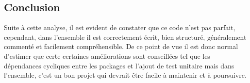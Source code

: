 \documentclass[12pt,a4paper,final]{article}
\begin{document}
\subsection{Conclusion}
Suite à cette analyse, il est evident de constater que ce code n'est pas parfait, cependant, dans l'ensemble il est correctement écrit, bien structuré, généralement commenté et facilement compréhensible. De ce point de vue il est donc normal d'estimer que certe certaines améliorations sont conseillées tel que les dépendances cycliques entre les packages et l'ajout de test unitaire mais dans l'ensemble, c'est un bon projet qui devrait être facile à maintenir et à poursuivre.

\newpage
\clearpage
\end{document}

